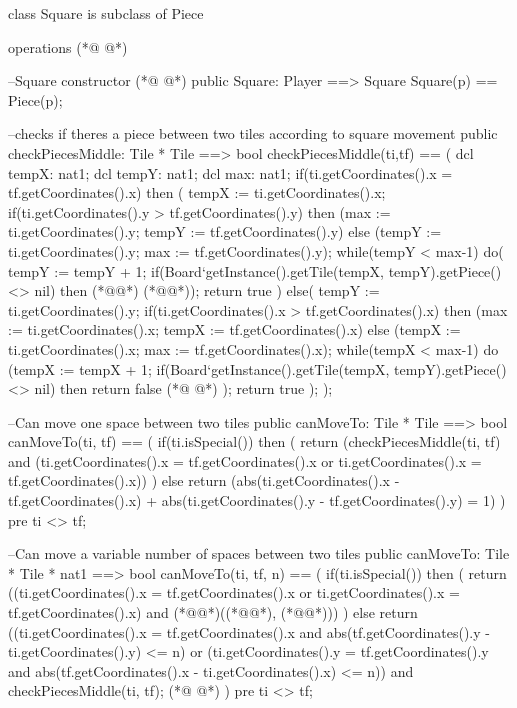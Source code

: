 \begin{vdmpp}[breaklines=true]
class Square is subclass of Piece

operations
(*@
\label{Square:4}
@*)


  --Square constructor
(*@
\label{checkPiecesMiddle:7}
@*)
  public Square: Player ==> Square
  Square(p) == Piece(p);
  
  
  --checks if theres a piece between two tiles according to square movement
  public checkPiecesMiddle: Tile * Tile ==> bool
  checkPiecesMiddle(ti,tf) == (
    dcl tempX: nat1;
    dcl tempY: nat1;
    dcl max: nat1;
    if(ti.getCoordinates().x = tf.getCoordinates().x)
     then (
        tempX := ti.getCoordinates().x;
        if(ti.getCoordinates().y > tf.getCoordinates().y)
         then (max := ti.getCoordinates().y; tempY := tf.getCoordinates().y)
         else (tempY := ti.getCoordinates().y; max := tf.getCoordinates().y);
        while(tempY < max-1)
         do(
           tempY := tempY + 1;
           if(Board`getInstance().getTile(tempX, tempY).getPiece() <> nil)
            then (*@@*) (*@@*));
        return true
        )
     else(
         tempY := ti.getCoordinates().y;
         if(ti.getCoordinates().x > tf.getCoordinates().x)
         then (max := ti.getCoordinates().x; tempX := tf.getCoordinates().x)
         else (tempX := ti.getCoordinates().x; max := tf.getCoordinates().x);
        while(tempX < max-1)
         do (tempX := tempX + 1;
           if(Board`getInstance().getTile(tempX, tempY).getPiece() <> nil)
            then return false
(*@
\label{canMoveTo:39}
@*)
           );
        return true
    );
  );
  
  --Can move one space between two tiles
  public canMoveTo: Tile * Tile ==> bool
  canMoveTo(ti, tf) == (
   if(ti.isSpecial())
    then (
     return (checkPiecesMiddle(ti, tf) and
         (ti.getCoordinates().x = tf.getCoordinates().x or 
          ti.getCoordinates().x = tf.getCoordinates().x))
    )
   else
    return (abs(ti.getCoordinates().x - tf.getCoordinates().x) + abs(ti.getCoordinates().y - tf.getCoordinates().y) = 1)
  )
  pre ti <> tf;
  
  --Can move a variable number of spaces between two tiles
  public canMoveTo: Tile * Tile * nat1 ==> bool
  canMoveTo(ti, tf, n) == (
   if(ti.isSpecial())
    then (
     return ((ti.getCoordinates().x = tf.getCoordinates().x or 
          ti.getCoordinates().x = tf.getCoordinates().x) and (*@@*)((*@@*), (*@@*)))
    )
   else
    return ((ti.getCoordinates().x = tf.getCoordinates().x and
          abs(tf.getCoordinates().y - ti.getCoordinates().y) <= n) or
        (ti.getCoordinates().y = tf.getCoordinates().y and 
           abs(tf.getCoordinates().x - ti.getCoordinates().x) <= n)) and
        checkPiecesMiddle(ti, tf);
(*@
\label{getSize:72}
@*)
  )
  pre ti <> tf;


\end{vdmpp}
